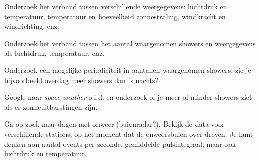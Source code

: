 \begin{questions}
\begin{savenotes}
\end{savenotes}

\question Onderzoek het verband tussen verschillende weergegevens:
luchtdruk en temperatuur, temperatuur en hoeveelheid zonnestraling,
windkracht en windrichting, enz.

\question Onderzoek het verband tussen het aantal waargenomen showers en
weergegevens als luchtdruk, temperatuur, enz.

\question Onderzoek een mogelijke periodiciteit in aantallen waargenomen
showers: zie je bijvoorbeeld overdag meer showers dan 's nachts?

\question Google naar \emph{space weather} o.i.d. en onderzoek of je meer
of minder showers ziet als er zonneuitbarstingen zijn.

\question Ga op zoek naar dagen met onweer (buienradar?). Bekijk de
\hisparc data voor verschillende stations, op het moment dat de
onweersbuien over dreven. Je kunt denken aan aantal events per seconde,
gemiddelde pulsintegraal, maar ook luchtdruk en temperatuur.


\end{questions}

